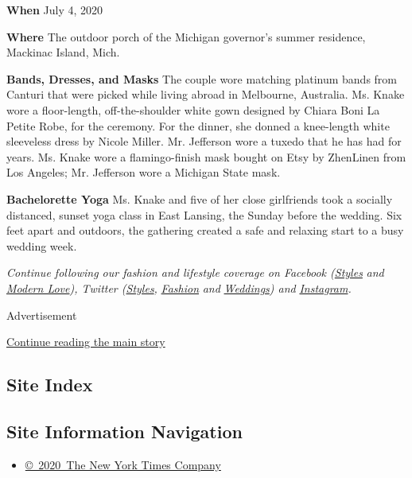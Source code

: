 \textbf{When} July 4, 2020

\textbf{Where} The outdoor porch of the Michigan governor's summer
residence, Mackinac Island, Mich.

\textbf{Bands, Dresses, and Masks} The couple wore matching platinum
bands from Canturi that were picked while living abroad in Melbourne,
Australia. Ms. Knake wore a floor-length, off-the-shoulder white gown
designed by Chiara Boni La Petite Robe, for the ceremony. For the
dinner, she donned a knee-length white sleeveless dress by Nicole
Miller. Mr. Jefferson wore a tuxedo that he has had for years. Ms. Knake
wore a flamingo-finish mask bought on Etsy by ZhenLinen from Los
Angeles; Mr. Jefferson wore a Michigan State mask.

\textbf{Bachelorette Yoga} Ms. Knake and five of her close girlfriends
took a socially distanced, sunset yoga class in East Lansing, the Sunday
before the wedding. Six feet apart and outdoors, the gathering created a
safe and relaxing start to a busy wedding week.

\emph{Continue following our fashion and lifestyle coverage on Facebook
(}\href{https://www.facebook.com/nytimesstyles}{\emph{Styles}}
\emph{and} \href{https://www.facebook.com/modernlove}{\emph{Modern
Love}}\emph{), Twitter
(}\href{https://twitter.com/nytstyles}{\emph{Styles}}\emph{,}
\href{https://twitter.com/nytfashion}{\emph{Fashion}} \emph{and}
\href{https://twitter.com/nytimesvows}{\emph{Weddings}}\emph{) and}
\href{https://instagram.com/nytimesfashion}{\emph{Instagram}}\emph{.}

Advertisement

\protect\hyperlink{after-bottom}{Continue reading the main story}

\hypertarget{site-index}{%
\subsection{Site Index}\label{site-index}}

\hypertarget{site-information-navigation}{%
\subsection{Site Information
Navigation}\label{site-information-navigation}}

\begin{itemize}
\tightlist
\item
  \href{https://help.nytimes.com/hc/en-us/articles/115014792127-Copyright-notice}{©~2020~The
  New York Times Company}
\end{itemize}

